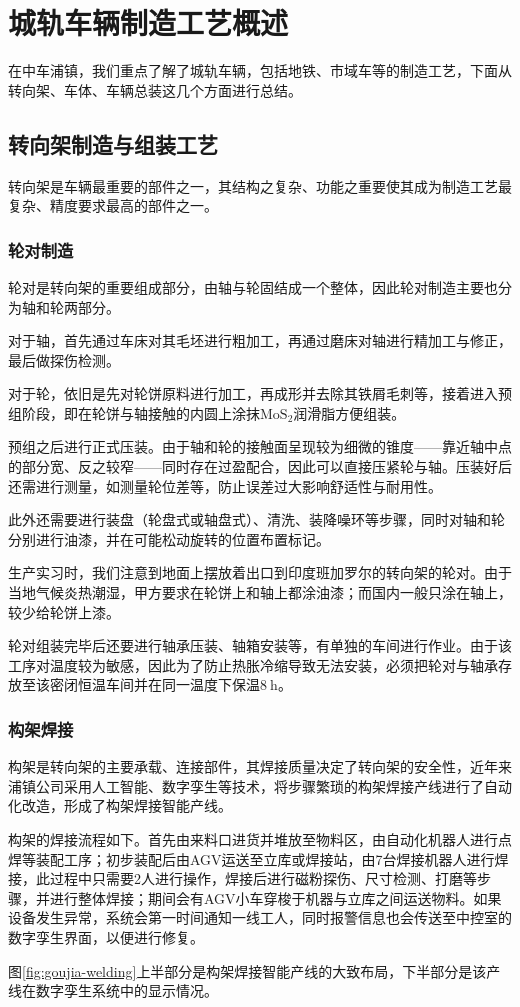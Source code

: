 ﻿\newpage
\section{城轨车辆制造工艺概述}
在中车浦镇，我们重点了解了城轨车辆，包括地铁、市域车等的制造工艺，下面从转向架、车体、车辆总装这几个方面进行总结。

\subsection{转向架制造与组装工艺}
转向架是车辆最重要的部件之一，其结构之复杂、功能之重要使其成为制造工艺最复杂、精度要求最高的部件之一。\par{}

\subsubsection{轮对制造}
轮对是转向架的重要组成部分，由轴与轮固结成一个整体，因此轮对制造主要也分为轴和轮两部分。\par{}
对于轴，首先通过车床对其毛坯进行粗加工，再通过磨床对轴进行精加工与修正，最后做探伤检测。\par{}
对于轮，依旧是先对轮饼原料进行加工，再成形并去除其铁屑毛刺等，接着进入预组阶段，即在轮饼与轴接触的内圆上涂抹$\mathrm{MoS_2}$润滑脂方便组装。\par{}
预组之后进行正式压装。由于轴和轮的接触面呈现较为细微的锥度——靠近轴中点的部分宽、反之较窄——同时存在过盈配合，因此可以直接压紧轮与轴。压装好后还需进行测量，如测量轮位差等，防止误差过大影响舒适性与耐用性。\par{}
此外还需要进行装盘（轮盘式或轴盘式）、清洗、装降噪环等步骤，同时对轴和轮分别进行油漆，并在可能松动旋转的位置布置标记。\par{}
生产实习时，我们注意到地面上摆放着出口到印度班加罗尔的转向架的轮对。由于当地气候炎热潮湿，甲方要求在轮饼上和轴上都涂油漆；而国内一般只涂在轴上，较少给轮饼上漆。\par{}
轮对组装完毕后还要进行轴承压装、轴箱安装等，有单独的车间进行作业。由于该工序对温度较为敏感，因此为了防止热胀冷缩导致无法安装，必须把轮对与轴承存放至该密闭恒温车间并在同一温度下保温$8~\mathrm{h}$。\par{}

\subsubsection{构架焊接}
构架是转向架的主要承载、连接部件，其焊接质量决定了转向架的安全性，近年来浦镇公司采用人工智能、数字孪生等技术，将步骤繁琐的构架焊接产线进行了自动化改造，形成了构架焊接智能产线。\par{}
构架的焊接流程如下。首先由来料口进货并堆放至物料区，由自动化机器人进行点焊等装配工序；初步装配后由AGV运送至立库或焊接站，由7台焊接机器人进行焊接，此过程中只需要2人进行操作，焊接后进行磁粉探伤、尺寸检测、打磨等步骤，并进行整体焊接；期间会有AGV小车穿梭于机器与立库之间运送物料。如果设备发生异常，系统会第一时间通知一线工人，同时报警信息也会传送至中控室的数字孪生界面，以便进行修复。\par{}
图\ref{fig:goujia-welding}上半部分是构架焊接智能产线的大致布局，下半部分是该产线在数字孪生系统中的显示情况。\par{}

